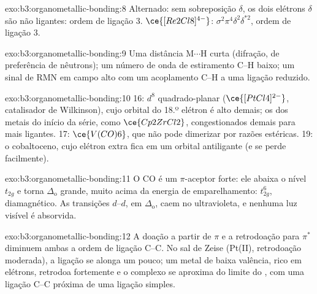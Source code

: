 \begin{solution}{exo:b3:organometallic-bonding:8}
Alternado: sem sobreposição $\delta$, os dois elétrons $\delta$ são não ligantes: ordem de ligação 3. $\ce{[Re2Cl8]^{4-}}$:
$\sigma^2\pi^4\delta^2\delta^{\ast2}$, ordem de ligação 3.
\end{solution}

\begin{solution}{exo:b3:organometallic-bonding:9}
Uma distância M$\cdots$H curta (difração, de preferência de nêutrons); um número de onda de estiramento C--H
baixo; um sinal de RMN em campo alto com um acoplamento C--H a uma ligação reduzido.
\end{solution}

\begin{solution}{exo:b3:organometallic-bonding:10}
16: $d^8$ quadrado-planar ($\ce{[PtCl4]^{2-}}$, catalisador de Wilkinson), cujo orbital do 18.º elétron
é alto demais; os  dos metais do início da série, como $\ce{Cp2ZrCl2}$, congestionados demais para mais
ligantes. 17: $\ce{V(CO)6}$, que não pode dimerizar por razões estéricas. 19: o cobaltoceno,
cujo elétron extra fica em um orbital antiligante (e se perde facilmente).
\end{solution}

\begin{solution}{exo:b3:organometallic-bonding:11}
O CO é um $\pi$-aceptor forte: ele abaixa o nível $t_{2g}$ e torna $\Delta_{\mathrm o}$ grande, muito acima da
energia de emparelhamento: $t_{2g}^6$, diamagnético. As transições $d$--$d$, em $\Delta_{\mathrm o}$, caem no ultravioleta,
e nenhuma luz visível é absorvida.
\end{solution}

\begin{solution}{exo:b3:organometallic-bonding:12}
A doação a partir de $\pi$ e a retrodoação para $\pi^*$ diminuem ambas a ordem de ligação C--C. No sal de Zeise
(Pt(II), retrodoação moderada), a ligação se alonga um pouco; um metal de baixa valência,
rico em elétrons, retrodoa fortemente e o complexo se aproxima do
limite do , com uma ligação C--C próxima de uma ligação simples.
\end{solution}

